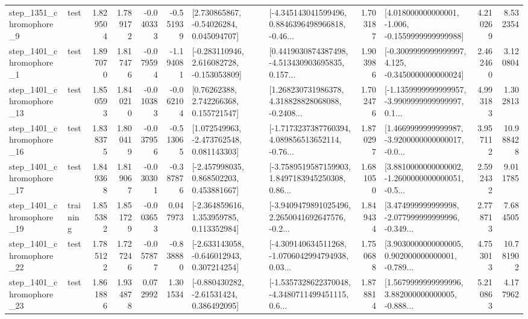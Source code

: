 \begin{tabular}{llrrrrllrlrr}
  step\_1351\_chromophore\_9 &      test &      1.829504 &    1.789172 &     -0.040333 & -0.551939 &     [2.730865867, -0.54026284, 0.045094707] &  [-4.345143041599496, 0.8846396498966818, -0.46... &       1.703187 &   [4.018000000000001, -1.006, -0.1559999999999988] &            4.210269 &          8.532354 \\
  step\_1401\_chromophore\_1 &      test &      1.897070 &    1.817476 &     -0.079594 & -1.194081 &   [-0.283110946, 2.616082728, -0.153053809] &  [0.4419030874387498, -4.513430903695835, 0.157... &       1.903986 &  [-0.3009999999999997, 4.125, -0.3450000000000024] &            2.462460 &          3.120804 \\
 step\_1401\_chromophore\_13 &      test &      1.850593 &    1.840210 &     -0.010383 & -0.062104 &      [0.76262388, 2.742266368, 0.155721547] &  [1.268230731986378, 4.318828828068088, -0.2408... &       1.702476 &  [-1.1359999999999957, -3.9909999999999997, 0.1... &            4.993183 &          1.302813 \\
 step\_1401\_chromophore\_16 &      test &      1.838375 &    1.800419 &     -0.037956 & -0.513065 &    [1.072549963, -2.473762548, 0.081143303] &  [-1.7173237387760394, 4.089856513652114, -0.76... &       1.870297 &  [1.4669999999999987, -3.9200000000000017, -0.0... &            3.957112 &         10.988428 \\
 step\_1401\_chromophore\_17 &      test &      1.849368 &    1.819067 &     -0.030301 & -0.387876 &    [-2.457998035, 0.868502203, 0.453881667] &  [-3.7589519587159903, 1.8497183945250308, 0.86... &       1.681050 &  [3.8810000000000002, -1.2600000000000051, -0.5... &            2.592432 &          9.011785 \\
 step\_1401\_chromophore\_19 &  training &      1.855382 &    1.851729 &     -0.003653 &  0.047973 &    [-2.364859616, 1.353959785, 0.113352984] &  [-3.9409479891025496, 2.2650041692647576, -0.2... &       1.849434 &  [3.474999999999998, -2.077999999999996, -0.349... &            2.778713 &          7.684505 \\
 step\_1401\_chromophore\_22 &      test &      1.785122 &    1.727246 &     -0.057877 & -0.838880 &   [-2.633143058, -0.646012943, 0.307214254] &  [-4.309140634511268, -1.0706042994794938, 0.03... &       1.750688 &  [3.9030000000000005, 0.902000000000001, -0.789... &            4.753013 &         10.781902 \\
 step\_1401\_chromophore\_23 &      test &      1.861886 &    1.934878 &      0.072992 &  1.301534 &    [-0.880430282, -2.61531424, 0.386492095] &  [-1.5357328622370048, -4.3480711499451115, 0.6... &       1.878814 &  [1.5679999999999996, 3.882000000000005, -0.888... &            5.210863 &          4.177962 \\

\end{tabular}
